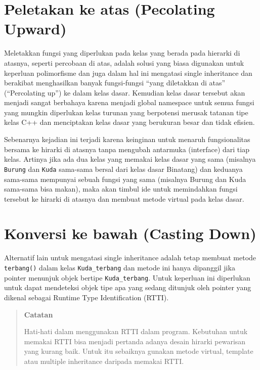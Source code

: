 \section{Peletakan ke atas (Pecolating
Upward)}\label{peletakan-ke-atas-pecolating-upward}

Meletakkan fungsi yang diperlukan pada kelas yang berada pada hierarki
di atasnya, seperti percobaan di atas, adalah solusi yang biasa
digunakan untuk keperluan polimorfisme dan juga dalam hal ini mengatasi
single inheritance dan berakibat menghasilkan banyak fungsi-fungsi
``yang diletakkan di atas'' (``Percolating up'') ke dalam kelas dasar.
Kemudian kelas dasar tersebut akan menjadi sangat berbahaya karena
menjadi global namespace untuk semua fungsi yang mungkin diperlukan
kelas turunan yang berpotensi merusak tatanan tipe kelas C++ dan
menciptakan kelas dasar yang berukuran besar dan tidak efisien.

Sebenarnya kejadian ini terjadi karena keinginan untuk menaruh
fungsionalitas bersama ke hirarki di atasnya tanpa mengubah antarmuka
(interface) dari tiap kelas. Artinya jika ada dua kelas yang memakai
kelas dasar yang sama (misalnya \texttt{Burung} dan \texttt{Kuda}
sama-sama bersal dari kelas dasar Binatang) dan keduanya sama-sama
mempunyai sebuah fungsi yang sama (misalnya Burung dan Kuda sama-sama
bisa makan), maka akan timbul ide untuk memindahkan fungsi tersebut ke
hirarki di atasnya dan membuat metode virtual pada kelas dasar.

\section{Konversi ke bawah (Casting
Down)}\label{konversi-ke-bawah-casting-down}

Alternatif lain untuk mengatasi single inheritance adalah tetap membuat
metode \texttt{terbang()} dalam kelas \texttt{Kuda\_terbang} dan metode
ini hanya dipanggil jika pointer menunjuk objek bertipe
\texttt{Kuda\_terbang}. Untuk keperluan ini diperlukan untuk dapat
mendeteksi objek tipe apa yang sedang ditunjuk oleh pointer yang dikenal
sebagai Runtime Type Identification (RTTI).
\begin{quotation}
 {\LARGE {}}  \textbf{Catatan}
	 
	 Hati-hati dalam menggunakan RTTI dalam program. Kebutuhan untuk memakai
	 RTTI bisa menjadi pertanda adanya desain hirarki pewarisan yang kurang
	 baik. Untuk itu sebaiknya gunakan metode virtual, template atau multiple
	 inheritance daripada memakai RTTI.
\end{quotation}


